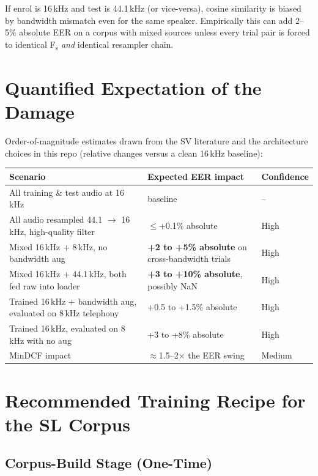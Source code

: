 \documentclass[11pt,a4paper]{article}
\begin{document}
If enrol is 16\,kHz and test is 44.1\,kHz (or vice-versa), cosine similarity is biased by
bandwidth mismatch even for the same speaker. Empirically this can add 2--5\% absolute EER on a
corpus with mixed sources unless every trial pair is forced to identical F\textsubscript{s}
\emph{and} identical resampler chain.

\section{Quantified Expectation of the Damage}
\label{sec:damage}

Order-of-magnitude estimates drawn from the SV literature and the architecture choices in this repo
(relative changes versus a clean 16\,kHz baseline):

\begin{center}
\begin{tabular}{p{7cm}p{3.5cm}p{2cm}}
\toprule
Scenario & Expected EER impact & Confidence \\
\midrule
All training \& test audio at 16\,kHz & baseline & -- \\
All audio resampled 44.1 $\to$ 16\,kHz, high-quality filter & $\leq$+0.1\% absolute & High \\
Mixed 16\,kHz + 8\,kHz, no bandwidth aug & \textbf{+2 to +5\% absolute} on cross-bandwidth trials & High \\
Mixed 16\,kHz + 44.1\,kHz, both fed raw into loader & \textbf{+3 to +10\% absolute}, possibly NaN & High \\
Trained 16\,kHz + bandwidth aug, evaluated on 8\,kHz telephony & +0.5 to +1.5\% absolute & High \\
Trained 16\,kHz, evaluated on 8\,kHz with no aug & +3 to +8\% absolute & High \\
MinDCF impact & $\approx$1.5--2$\times$ the EER swing & Medium \\
\bottomrule
\end{tabular}
\end{center}

\section{Recommended Training Recipe for the SL Corpus}
\label{sec:recipe}

\subsection{Corpus-Build Stage (One-Time)}
\end{document}
